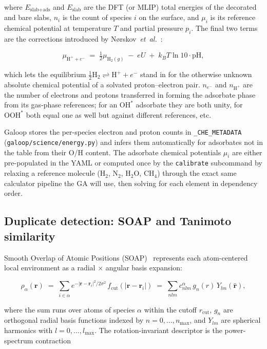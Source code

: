\documentclass[11pt,letterpaper]{article}
\begin{document}
where $E_{\text{slab+ads}}$ and $E_{\text{slab}}$ are the DFT (or MLIP)
total energies of the decorated and bare slabs, $n_i$ is the count of
species $i$ on the surface, and $\mu_i$ is its reference chemical
potential at temperature $T$ and partial pressure $p_i$. The final two
terms are the corrections introduced by
N{\o}rskov~\emph{et~al.}~\citep{norskov2004che}:

\begin{equation}
\mu_{\text{H}^+ + e^-} \;=\; \tfrac{1}{2}\mu_{\text{H}_2(g)}\;-\;eU\;+\;k_B T \ln 10 \cdot \text{pH},
\end{equation}

which lets the equilibrium $\tfrac{1}{2}\text{H}_2 \rightleftharpoons \text{H}^+ + e^-$
stand in for the otherwise unknown absolute chemical potential of a
solvated proton--electron pair. $n_{e^-}$ and $n_{\text{H}^+}$ are the
number of electrons and protons transferred in forming the adsorbate
phase from its gas-phase references; for an $\text{OH}^*$ adsorbate
they are both unity, for $\text{OOH}^*$ both equal one as well but
against different references, etc.

Galoop stores the per-species electron and proton counts in
\texttt{\_CHE\_METADATA} (\texttt{galoop/science/energy.py}) and infers
them automatically for adsorbates not in the table from their O/H
content. The adsorbate chemical potentials $\mu_i$ are either
pre-populated in the YAML or computed once by the \texttt{calibrate}
subcommand by relaxing a reference molecule (H$_2$, N$_2$, H$_2$O,
CH$_4$) through the exact same calculator pipeline the GA will use,
then solving for each element in dependency order.

\subsection{Duplicate detection: SOAP and Tanimoto similarity}

Smooth Overlap of Atomic Positions (SOAP)~\citep{bartok2013soap}
represents each atom-centered local environment as a radial$\,\times\,$angular
basis expansion:

\begin{equation}
\rho_\alpha(\mathbf{r})
  \;=\;
  \sum_{i \in \alpha} e^{-|\mathbf{r}-\mathbf{r}_i|^2 / 2\sigma^2}\,
    f_{\text{cut}}(|\mathbf{r}-\mathbf{r}_i|)
  \;=\;
  \sum_{nlm} c^\alpha_{nlm}\, g_n(r)\, Y_{lm}(\hat{\mathbf{r}}),
\end{equation}

where the sum runs over atoms of species $\alpha$ within the cutoff
$r_{\text{cut}}$, $g_n$ are orthogonal radial basis functions indexed
by $n = 0,\dots,n_{\max}$, and $Y_{lm}$ are spherical harmonics with
$l = 0,\dots,l_{\max}$. The rotation-invariant descriptor is the
power-spectrum contraction
\end{document}
